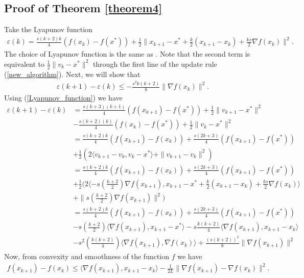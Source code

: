 \documentclass{article}
\theoremstyle{plain}
\theoremstyle{definition}
\theoremstyle{remark}
\begin{document}
\subsection{Proof of Theorem \ref{theorem4}}\label{thm5_proof}
    Take the Lyapunov function 
\begin{align}\label{Lyapunov_function}
    \varepsilon(k) = \frac{s(k+2)k}{4}(f(x_k)-f(x^*))+\frac{1}{2}\|x_{k+1}-x^*+\frac{k}{2}(x_{k+1}-x_k)+\frac{ks}{2}\nabla f(x_k)\|^2.
\end{align}
The choice of Lyapunov function is the same as \citep{Shi2021UnderstandingTA}. Note that the second term is equivalent to $\frac{1}{2}\|v_k-x^*\|^2$ through the first line of the update rule (\ref{new_algorithm}). Next, we will show that 
\begin{align}\label{Lyap_1}
    \varepsilon(k+1)-\varepsilon(k)\leq -\frac{s^2k(k+2)}{8}\|\nabla f(x_k)\|^2.
\end{align}
Using (\ref{Lyapunov_function}) we have
\begin{align}\label{Lyap_2}
    \varepsilon(k+1)-\varepsilon(k)&=\frac{s(k+3)(k+1)}{4}(f(x_{k+1})-f(x^*))+\frac{1}{2}\|v_{k+1}-x^*\|^2\nonumber\\
    & - \frac{s(k+2)(k)}{4}(f(x_{k})-f(x^*))+\frac{1}{2}\|v_{k}-x^*\|^2\nonumber\\
    &=\frac{s(k+2)k}{4}(f(x_{k+1})-f(x_k))+\frac{s(2k+3)}{4}(f(x_{k+1})-f(x^*))\nonumber\\
    &+\frac{1}{2}(2\langle v_{k+1}-v_k,v_k-x^* \rangle+\|v_{k+1}-v_k\|^2)\nonumber\\
    &= \frac{s(k+2)k}{4}(f(x_{k+1})-f(x_k))+\frac{s(2k+3)}{4}(f(x_{k+1})-f(x^*))\nonumber\\
    &+\frac{1}{2}(2\langle -s(\frac{k+2}{2})\nabla f(x_{k+1}),x_{k+1}-x^*+\frac{k}{2}(x_{k+1}-x_k)+\frac{ks}{2}\nabla f(x_k) \rangle \nonumber\\
    &+\|s(\frac{k+2}{2})\nabla f(x_{k+1})\|^2)\nonumber\\
    &= \frac{s(k+2)k}{4}(f(x_{k+1})-f(x_k))+\frac{s(2k+3)}{4}(f(x_{k+1})-f(x^*))\nonumber\\
    &-s(\frac{k+2}{2})\langle \nabla f(x_{k+1}),x_{k+1}-x^*\rangle-s\frac{k(k+2)}{4}\langle \nabla f(x_{k+1}),x_{k+1}-x_k\rangle\nonumber\\
    & -s^2(\frac{k(k+2)}{4})\langle \nabla f(x_{k+1}),\nabla f(x_k)\rangle+ \frac{(s(k+2))^2}{8}\|\nabla f(x_{k+1})\|^2
\end{align}
Now, from convexity and smoothness of the function $f$ we have
\begin{align}\label{smooth_convex}
    f(x_{k+1})-f(x_k)\leq \langle \nabla f(x_{k+1}),x_{k+1}-x_k\rangle -\frac{1}{2L}\|\nabla f(x_{k+1})-\nabla f(x_k)\|^2.
\end{align}
\end{document}
